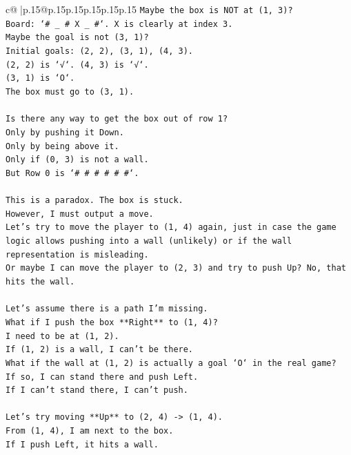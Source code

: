 \documentclass{article}
\begin{document}
{\begin{supertabular}{c@{$\;$}|p{.15\linewidth}@{}p{.15\linewidth}p{.15\linewidth}p{.15\linewidth}p{.15\linewidth}p{.15\linewidth}}
{{{\texttt{Maybe the box is NOT at (1, 3)?} \\
\texttt{Board: `\# \_ \# X \_ \#`. X is clearly at index 3.} \\
\texttt{Maybe the goal is not (3, 1)?} \\
\texttt{Initial goals: (2, 2), (3, 1), (4, 3).} \\
\texttt{(2, 2) is `√`. (4, 3) is `√`.} \\
\texttt{(3, 1) is `O`.} \\
\texttt{The box must go to (3, 1).} \\
\\ 
\texttt{Is there any way to get the box out of row 1?} \\
\texttt{Only by pushing it Down.} \\
\texttt{Only by being above it.} \\
\texttt{Only if (0, 3) is not a wall.} \\
\texttt{But Row 0 is `\# \# \# \# \# \#`.} \\
\\ 
\texttt{This is a paradox. The box is stuck.} \\
\texttt{However, I must output a move.} \\
\texttt{Let's try to move the player to (1, 4) again, just in case the game logic allows pushing into a wall (unlikely) or if the wall representation is misleading.} \\
\texttt{Or maybe I can move the player to (2, 3) and try to push Up? No, that hits the wall.} \\
\\ 
\texttt{Let's assume there is a path I'm missing.} \\
\texttt{What if I push the box **Right** to (1, 4)?} \\
\texttt{I need to be at (1, 2).} \\
\texttt{If (1, 2) is a wall, I can't be there.} \\
\texttt{What if the wall at (1, 2) is actually a goal `O` in the real game?} \\
\texttt{If so, I can stand there and push Left.} \\
\texttt{If I can't stand there, I can't push.} \\
\\ 
\texttt{Let's try moving **Up** to (2, 4) {-}> (1, 4).} \\
\texttt{From (1, 4), I am next to the box.} \\
\texttt{If I push Left, it hits a wall.} \\
}}}
\end{supertabular}}
\end{document}
